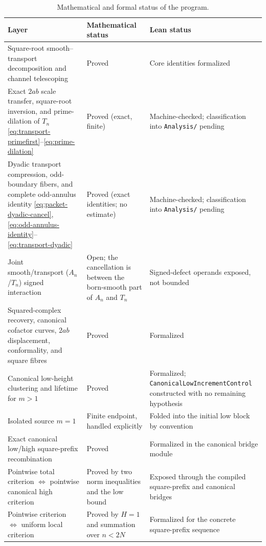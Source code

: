 \documentclass[11pt]{article}
\theoremstyle{definition}
\theoremstyle{remark}
\newcommand{\1}{\mathbf{1}}
\begin{document}
\begin{table}[htbp]
\centering
\caption{Mathematical and formal status of the program.}
\label{tab:status}
\small
\renewcommand{\arraystretch}{1.20}
\begin{tabular}{>{\raggedright\arraybackslash}p{}
                >{\raggedright\arraybackslash}p{}
                >{\raggedright\arraybackslash}p{}}
\toprule
Layer & Mathematical status & Lean status\\
\midrule
Square-root smooth--transport decomposition and channel telescoping
& Proved
& Core identities formalized\\
Exact $2ab$ scale transfer, square-root inversion, and prime-dilation of $T_n$ \eqref{eq:transport-primefirst}--\eqref{eq:prime-dilation}
& Proved (exact, finite)
& Machine-checked; classification into \texttt{Analysis/} pending\\
Dyadic transport compression, odd-boundary fibers, and complete odd-annulus identity \eqref{eq:packet-dyadic-cancel},\,\eqref{eq:odd-annulus-identity}--\eqref{eq:transport-dyadic}
& Proved (exact identities; no estimate)
& Machine-checked; classification into \texttt{Analysis/} pending\\
Joint smooth/transport ($A_n$/$T_n$) signed interaction
& Open; the cancellation is between the born-smooth part of $A_n$ and $T_n$
& Signed-defect operands exposed, not bounded\\
Squared-complex recovery, canonical cofactor curves, $2ab$ displacement, conformality, and square fibres
& Proved
& Formalized\\
Canonical low-height clustering and lifetime for $m>1$
& Proved
& Formalized; \texttt{CanonicalLowIncrementControl} constructed with no remaining hypothesis\\
Isolated source $m=1$
& Finite endpoint, handled explicitly
& Folded into the initial low block by convention\\
Exact canonical low/high square-prefix recombination
& Proved
& Formalized in the canonical bridge module\\
Pointwise total criterion $\Longleftrightarrow$ pointwise canonical high criterion
& Proved by two norm inequalities and the low bound
& Exposed through the compiled square-prefix and canonical bridges\\
Pointwise criterion $\Longleftrightarrow$ uniform local criterion
& Proved by $H=1$ and summation over $n<2N$
& Formalized for the concrete square-prefix sequence\\

\end{tabular}
\end{table}
\end{document}
